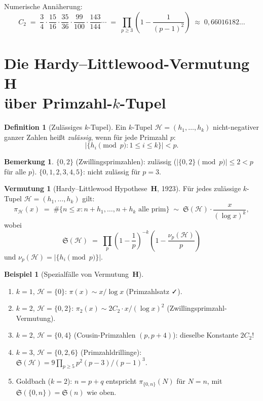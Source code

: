 \documentclass[12pt,a4paper]{amsart}
\theoremstyle{definition}
\newtheorem{definition}[theorem]{Definition}
\newtheorem{bemerkung}[theorem]{Bemerkung}
\newtheorem{vermutung}[theorem]{Vermutung}
\newtheorem{beispiel}[theorem]{Beispiel}
\begin{document}
Numerische Annäherung:
\[
  C_2 \;=\; \frac{3}{4} \cdot \frac{15}{16} \cdot \frac{35}{36} \cdot \frac{99}{100}
       \cdot \frac{143}{144} \cdots
  \;=\; \prod_{p \geq 3} \left(1 - \frac{1}{(p-1)^2}\right)
  \;\approx\; 0{,}66016182\ldots
\]

\section{Die Hardy--Littlewood-Vermutung~$\mathbf{H}$\\
         über Primzahl-$k$-Tupel}
\label{sec:ktuples}

\begin{definition}[Zulässiges $k$-Tupel]
  Ein $k$-Tupel $\mathcal{H} = (h_1, \ldots, h_k)$ nicht-negativer ganzer Zahlen
  heißt \emph{zulässig}, wenn für jede Primzahl $p$:
  \[
    \bigl|\{h_i \pmod p : 1 \leq i \leq k\}\bigr| < p.
  \]
\end{definition}

\begin{bemerkung}
  $\{0, 2\}$ (Zwillingsprimzahlen): zulässig ($|\{0,2\} \pmod p| \leq 2 < p$
  für alle $p$).  $\{0, 1, 2, 3, 4, 5\}$: nicht zulässig für $p = 3$.
\end{bemerkung}

\begin{vermutung}[Hardy--Littlewood Hypothese~$\mathbf{H}$, 1923]\label{verm:H}
  Für jedes zulässige $k$-Tupel $\mathcal{H} = (h_1, \ldots, h_k)$ gilt:
  \[
    \pi_{\mathcal{H}}(x)
    \;=\; \#\bigl\{n \leq x : n+h_1, \ldots, n+h_k \text{ alle prim}\bigr\}
    \;\sim\; \mathfrak{S}(\mathcal{H}) \cdot \frac{x}{(\log x)^k},
  \]
  wobei
  \[
    \mathfrak{S}(\mathcal{H})
    \;=\; \prod_p \left(1-\frac{1}{p}\right)^{-k} \left(1-\frac{\nu_p(\mathcal{H})}{p}\right)
  \]
  und $\nu_p(\mathcal{H}) = |\{h_i \pmod p\}|$.
\end{vermutung}

\begin{beispiel}[Spezialfälle von Vermutung~$\mathbf{H}$]
  \begin{enumerate}
    \item $k=1$, $\mathcal{H}=\{0\}$:
      $\pi(x) \sim x/\log x$ (Primzahlsatz ✓).
    \item $k=2$, $\mathcal{H}=\{0,2\}$:
      $\pi_2(x) \sim 2C_2 \cdot x/(\log x)^2$ (Zwillingsprimzahl-Vermutung).
    \item $k=2$, $\mathcal{H}=\{0,4\}$ (Cousin-Primzahlen $(p,p+4)$):
      dieselbe Konstante $2C_2$!
    \item $k=3$, $\mathcal{H}=\{0,2,6\}$ (Primzahldrillinge):
      $\mathfrak{S}(\mathcal{H}) = 9 \prod_{p \geq 5} p^2(p-3)/(p-1)^3$.
    \item Goldbach ($k=2$): $n = p+q$ entspricht $\pi_{\{0,n\}}(N)$ für $N=n$,
      mit $\mathfrak{S}(\{0,n\}) = \mathfrak{S}(n)$ wie oben.
  \end{enumerate}
\end{beispiel}
\end{document}
